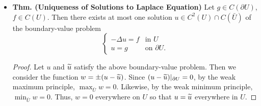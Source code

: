 \documentclass{article}
\begin{document}
\begin{itemize}
		\begin{proof}
			Since $u$ satisfies Laplace's equation in $U$, it follows that $u$ is harmonic in $U$ so that the strong maximum/minimum principles apply to $u$. By the weak minimum principle, for every $x \in \bar{U}$, $u(x) \geq \min_{\partial U}u = \min_{\partial U}g \geq 0$ so that $g(x)$ is nonnegative everywhere. Define the subset 
			\begin{equation*}
				A = \{z\in U: u(z) > 0\}. 
			\end{equation*}
			If $A$ is empty, then $u(x) = 0$ everywhere on $U$. Thus by continuity of $u$ on $\bar{U}$, $u \equiv 0$ on $\partial U$ so that $g \equiv 0$ on $\partial U$. But this contradicts our hypothesis that $g$ is positive somewhere on $\partial U$. Therefore, $A$ is nonempty. By continuity of $u$, $A$ is open in $U$. Thus it suffices to show that $A$ is relatively closed in $U$. Let $\{z_{k}\} \subset A$ be a sequence that converges to some $z \in U$. We must show that $z \in A$. Since $u(z_{k}) > 0$ for all $k$, $u(z) \geq 0$. Assume to the contrary that $u(z)= 0$. Then $u$ achieves its minimum at $z$ so that by the strong minimum principle, $u$ must be zero everywhere in $U$, which is a contradiction. Thus by contradiction, $u(z) > 0$. I.e., $z \in A$, which completes the proof that $A$ is relatively closed in $U$. Thus since $U$ is connected, we conclude that $A = U$. 
		\end{proof}
		
		\item \textbf{Thm. (Uniqueness of Solutions to Laplace Equation)} Let $g \in C(\partial U)$, $f \in C(U)$. Then there exists at most one solution $u \in C^{2}(U) \cap C(\bar{U})$ of the boundary-value problem 
		\begin{equation*}
			\begin{cases}
				-\Delta u = f & \text{in $U$} \\
				u = g & \text{on $\partial U$}. 
			\end{cases}
		\end{equation*}
		\begin{proof}
			Let $u$ and $\widetilde{u}$ satisfy the above boundary-value problem. Then we consider the function $w = \pm (u - \widetilde{u})$. Since $(u - \widetilde{u})|_{\partial U} = 0$, by the weak maximum principle, $\max_{\bar{U}}w = 0$. Likewise, by the weak minimum principle, $\min_{\bar{U}}w = 0$. Thus, $w = 0$ everywhere on $U$ so that $u = \widetilde{u}$ everywhere in $U$. 
		\end{proof}
		

\end{itemize}
\end{document}
